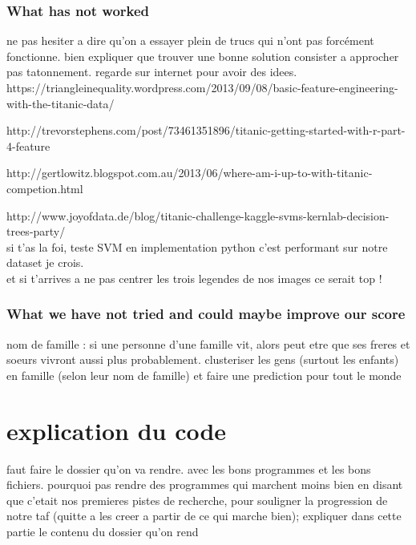 \documentclass[11pt,a4paper,portrait]{article}
\begin{document}
\section{What has not worked}
ne pas hesiter a dire qu'on a essayer plein de trucs qui n'ont pas forcément fonctionne. bien expliquer que trouver une bonne solution consister a approcher pas tatonnement. regarde sur internet pour avoir des idees.
https://triangleinequality.wordpress.com/2013/09/08/basic-feature-engineering-with-the-titanic-data/

http://trevorstephens.com/post/73461351896/titanic-getting-started-with-r-part-4-feature

http://gertlowitz.blogspot.com.au/2013/06/where-am-i-up-to-with-titanic-competion.html

http://www.joyofdata.de/blog/titanic-challenge-kaggle-svms-kernlab-decision-trees-party/
\\
si t'as la foi, teste SVM en implementation python c'est performant sur notre dataset je crois.\\
et si t'arrives a ne pas centrer les trois legendes de nos images ce serait top !


\section{What we have not tried and could maybe improve our score}
nom de famille : si une personne d'une famille vit, alors peut etre que ses freres et soeurs vivront aussi plus probablement.
clusteriser les gens (surtout les enfants) en famille (selon leur nom de famille) et faire une prediction pour tout le monde


\part*{explication du code}
faut faire le dossier qu'on va rendre. avec les bons programmes et les bons fichiers. pourquoi pas rendre des programmes qui marchent moins bien en disant que c'etait nos premieres pistes de recherche, pour souligner la progression de notre taf (quitte a les creer a partir de ce qui marche bien);
expliquer dans cette partie le contenu du dossier qu'on rend
\end{document}
